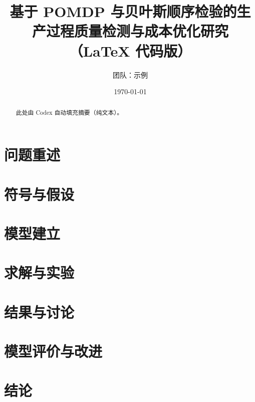 \documentclass[12pt]{article}
\title{基于 POMDP 与贝叶斯顺序检验的生产过程质量检测与成本优化研究（LaTeX 代码版）}
\author{团队：示例}
\date{\today}
\begin{document}
\maketitle

\begin{abstract}
此处由 Codex 自动填充摘要（纯文本）。
\end{abstract}

\section{问题重述}


\section{符号与假设}


\section{模型建立}


\section{求解与实验}


\section{结果与讨论}


\section{模型评价与改进}


\section{结论}




\end{document}
